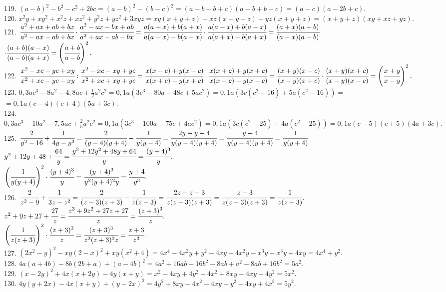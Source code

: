 \documentclass[12pt]{article}
\begin{document}
119. $(a-b)^2-b^2-c^2+2bc=(a-b)^2-(b-c)^2=(a-b-b+c)(a-b+b-c)=(a-c)(a-2b+c).$\\
120. $x^2y+xy^2+x^2z+xz^2+y^2z+yz^2+3xyz=xy(x+y+z)+xz(x+y+z)+yz(x+y+z)=(x+y+z)(xy+xz+yz).$\\
121. $\cfrac{a^2+ax+ab+bx}{a^2-ax-ab+bx}\cdot\cfrac{a^2-ax-bx+ab}{a^2+ax-ab-bx}=\cfrac{a(a+x)+b(a+x)}{a(a-x)-b(a-x)}\cdot\cfrac{a(a-x)+b(a-x)}{a(a+x)-b(a+x)}=
\cfrac{(a+x)(a+b)}{(a-x)(a-b)}\cdot$\\$\cdot\cfrac{(a+b)(a-x)}{(a-b)(a+x)}=\left(\cfrac{a+b}{a-b}\right)^2.$\\
122. $\cfrac{x^2-xc-yc+xy}{x^2+xc-yc-xy}:\cfrac{x^2-xc-xy+yc}{x^2+xc+xy+yc}=\cfrac{x(x-c)+y(x-c)}{x(x+c)-y(x+c)}\cdot\cfrac{x(x+c)+y(x+c)}{x(x-c)-y(x-c)}=
\cfrac{(x+y)(x-c)}{(x-y)(x+c)}\cdot\cfrac{(x+y)(x+c)}{(x-y)(x-c)}=\left(\cfrac{x+y}{x-y}\right)^2.$\\
123. $0,3ac^3-8a^2-4,8ac+\frac{1}{2}a^2c^2=0,1a(3c^3-80a-48c+5ac^2)=0,1a(3c(c^2-16)+5a(c^2-16))=$\\$=0,1a(c-4)(c+4)(5a+3c).$\\
124. $0,3ac^3-10a^2-7,5ac+\frac{2}{5}a^2c^2=0,1a(3c^3-100a-75c+4ac^2)=0,1a(3c(c^2-25)+4a(c^2-25))=0,1a(c-5)(c+5)(4a+3c).$\\
125. $\cfrac{2}{y^2-16}+\cfrac{1}{4y-y^2}=\cfrac{2}{(y-4)(y+4)}-\cfrac{1}{y(y-4)}=\cfrac{2y-y-4}{y(y-4)(y+4)}=\cfrac{y-4}{y(y-4)(y+4)}=\cfrac{1}{y(y+4)}.$\\
$y^2+12y+48+\cfrac{64}{y}=\cfrac{y^3+12y^2+48y+64}{y}=\cfrac{(y+4)^3}{y}.$\\
$\left(\cfrac{1}{y(y+4)}\right)^2\cdot\cfrac{(y+4)^3}{y}=\cfrac{(y+4)^3}{y^2(y+4)^2y}=\cfrac{y+4}{y^3}.$\\
126. $\cfrac{2}{z^2-9}+\cfrac{1}{3z-z^2}=\cfrac{2}{(z-3)(z+3)}-\cfrac{1}{z(z-3)}=\cfrac{2z-z-3}{z(z-3)(z+3)}=\cfrac{z-3}{z(z-3)(z+3)}=\cfrac{1}{z(z+3)}.$\\
$z^2+9z+27+\cfrac{27}{z}=\cfrac{z^3+9z^2+27z+27}{z}=\cfrac{(z+3)^3}{z}.$\\
$\left(\cfrac{1}{z(z+3)}\right)^2\cdot\cfrac{(z+3)^3}{z}=\cfrac{(z+3)^3}{z^2(z+3)^2z}=\cfrac{z+3}{z^3}.$\\
127. $(2x^2-y)^2-xy(2-x)^2+xy(x^2+4)=4x^4-4x^2y+y^2-4xy+4x^2y-x^3y+x^3y+4xy=4x^4+y^2.$\\
128. $4a(a+4b)-8b(2b+a)+(a-4b)^2=4a^2+16ab-16b^2-8ab+a^2-8ab+16b^2=5a^2.$\\
129. $(x-2y)^2+4x(x+2y)-4y(x+y)=x^2-4xy+4y^2+4x^2+8xy-4xy-4y^2=5x^2.$\\
130. $4y(y+2x)-4x(x+y)+(y-2x)^2=4y^2+8xy-4x^2-4xy+y^2-4xy+4x^2=5y^2.$\\
\end{document}
